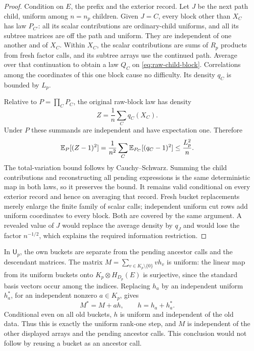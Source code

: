 \begin{proof}
Condition on $E$, the prefix and the exterior record.  Let $J$ be the next
path child, uniform among $n=n_p$ children.  Given $J=C$, every block other
than $X_C$ has law $P_{C'}$: all its scalar contributions are ordinary-child
uniforms, and all its subtree matrices are off the path and uniform.  They
are independent of one another and of $X_C$.  Within $X_C$, the scalar
contributions are sums of $R_p$ products from fresh factor calls, and its
subtree arrays use the continued path.  Average over that continuation to
obtain a law $Q_C$ on \eqref{eq:raw-child-block}.  Correlations among the
coordinates of this one block cause no difficulty.  Its density $q_C$ is
bounded by $L_p$.

Relative to $P=\prod_CP_C$, the original raw-block law has density
\[
 Z=\frac1n\sum_Cq_C(X_C).
\]
Under $P$ these summands are independent and have expectation one.  Therefore
\[
 \mathbb E_P[(Z-1)^2]
   =\frac1{n^2}\sum_C\mathbb E_{P_C}[(q_C-1)^2]
   \le\frac{L_p^2}{n}.
\]
The total-variation bound follows by Cauchy--Schwarz.  Summing the child
contributions and reconstructing all pending expressions is the same
deterministic map in both laws, so it preserves the bound.  It remains valid
conditional on every exterior record and hence on averaging that record.
Fresh bucket replacements merely enlarge the finite family of scalar calls;
independent uniform cut rows add uniform coordinates to every block.  Both
are covered by the same argument.  A revealed value of $J$ would replace the
average density by $q_J$ and would lose the factor $n^{-1/2}$, which explains
the required information restriction.
\end{proof}

In $\mathsf U_p$, the own buckets are separate from the pending ancestor
calls and the descendant matrices.  The matrix
$M=\sum_{v\in K_p\setminus\{0\}}v h_v$ is uniform: the linear map from its
uniform buckets onto $K_p\otimes H_{D_p}(E)$ is surjective, since the standard
basis vectors occur among the indices.  Replacing $h_a$ by an independent
uniform $h_a^*$, for an independent nonzero $a\in K_p$, gives
\begin{equation}\label{eq:unrestricted-step}
 M^*=M+a h,\qquad h=h_a+h_a^*.
\end{equation}
Conditional even on all old buckets, $h$ is uniform and independent of the
old data.  Thus this is exactly the uniform rank-one step, and $M$ is
independent of the other displayed arrays and the pending ancestor calls.
This conclusion would not follow by reusing a bucket as an ancestor call.

